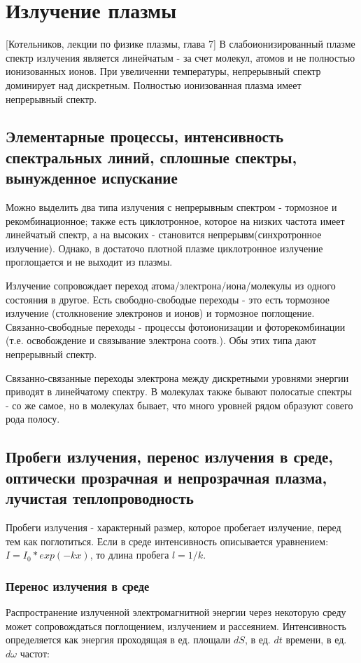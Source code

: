 \documentclass[10pt, a4paper]{article}
\let\stdsection\section
\renewcommand\section{\newpage\stdsection}
\begin{document}
\section{Излучение плазмы}
[Котельников, лекции по физике плазмы, глава 7]
В слабоионизированный плазме спектр излучения является линейчатым - за счет молекул, атомов и не полностью ионизованных
ионов. При увеличенни температуры, непрерывный спектр доминирует над дискретным. Полностью ионизованная плазма имеет
непрерывный спектр.
\subsection{Элементарные процессы, интенсивность спектральных линий, сплошные спектры, вынужденное испускание}
Можно выделить два типа излучения с непрерывным спектром - тормозное и рекомбинационное; также есть циклотронное,
которое на низких частота имеет линейчатый спектр, а на высоких - становится непрерывм(синхротронное излучение). Однако,
в достаточо плотной плазме циклотронное излучение проглощается и не выходит из плазмы.

Излучение сопровождает переход атома/электрона/иона/молекулы из одного состояния в другое. Есть свободно-свободые переходы
- это есть тормозное излучение (столкновение электронов и ионов) и тормозное поглощение. Связанно-свободные переходы - 
процессы фотоионизации и фоторекомбинации (т.е. освобождение и связывание электрона соотв.). Обы этих типа дают 
непрерывный спектр.

Связанно-связанные переходы электрона между дискретными уровнями энергии приводят в линейчатому спектру. В молекулах также
бывают полосатые спектры - со же самое, но в молекулах бывает, что много уровней рядом образуют совего рода полосу.

\subsection{Пробеги излучения, перенос излучения в среде, оптически прозрачная и непрозрачная плазма, лучистая теплопроводность}
Пробеги излучения - характерный размер, которое пробегает излучение, перед тем как поглотиться. Если в среде интенсивность описывается уравнением: $I=I_0 * exp(-kx)$, то длина пробега $l=1/k$.

\subsubsection{Перенос излучения в среде}
Распространение излученной электромагнитной энергии через некоторую среду может сопровождаться поглощением, излучением и рассеянием. Интенсивность определяется как энергия проходящая в ед. площали $dS$, в ед. $dt$ времени, в ед. $d\omega$ частот:
\end{document}

